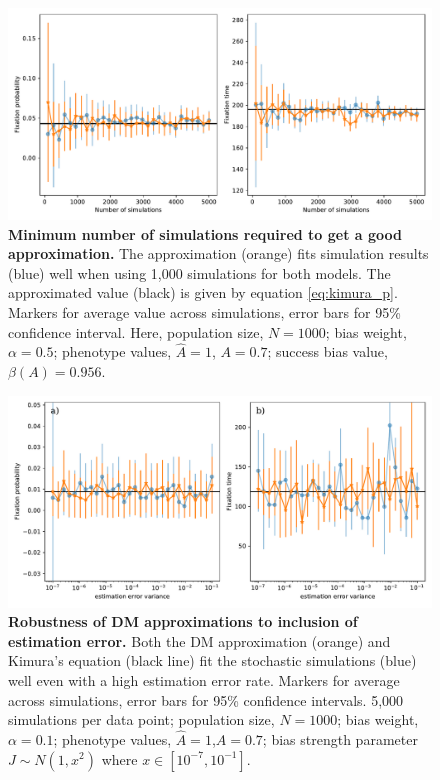 \documentclass[12pt]{extarticle}
\begin{document}
\begin{figure}[h]
    \includegraphics[width=\linewidth]{../figures/binary/num_sims.pdf}
  \caption{
  \textbf{Minimum number of simulations required to get a good approximation.}
  The approximation (orange) fits simulation results (blue) well when using 1,000 simulations for both models. The approximated value (black) is given by equation \cref{eq:kimura_p}.
  Markers for average value across simulations, error bars for 95\% confidence interval.
  Here, population size, $N=1000$; bias weight, $\alpha=0.5$; phenotype values, $\hat{A}=1$, $A=0.7$; success bias value, $\beta(A)=0.956$.}	
  \label{fig:num_sims}
\end{figure}


\begin{figure}
    \includegraphics[width=\linewidth]{../figures/binary/full_vs_dm_mutation.pdf}
  \caption{
  \textbf{Robustness of DM approximations to inclusion of estimation error.} Both the DM approximation (orange) and Kimura's equation (black line) fit the stochastic simulations (blue) well even with a high estimation error rate. Markers for average across simulations, error bars for 95\% confidence intervals.
  5,000 simulations per data point; population size, $N=1000$; bias weight, $\alpha=0.1$; phenotype values, $\hat{A}=1$,$A=0.7$; bias strength parameter $J\sim N(1,x^2)$ where $x \in [10^{-7},10^{-1}]$.
  }	
  \label{fig:hetro_error}
\end{figure}
\end{document}

